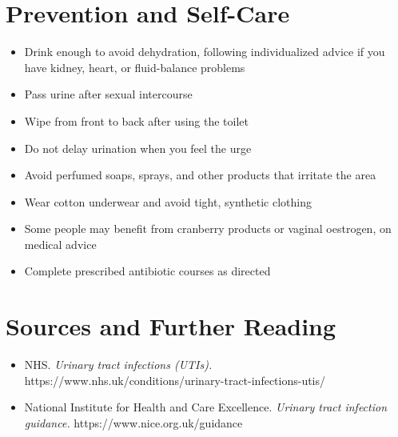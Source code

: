 \section*{Prevention and Self-Care}
\begin{itemize}
    \item Drink enough to avoid dehydration, following individualized advice if you have kidney, heart, or fluid-balance problems
    \item Pass urine after sexual intercourse
    \item Wipe from front to back after using the toilet
    \item Do not delay urination when you feel the urge
    \item Avoid perfumed soaps, sprays, and other products that irritate the area
    \item Wear cotton underwear and avoid tight, synthetic clothing
    \item Some people may benefit from cranberry products or vaginal oestrogen, on medical advice
    \item Complete prescribed antibiotic courses as directed
\end{itemize}

\section*{Sources and Further Reading}
\begin{itemize}
    \item NHS. \textit{Urinary tract infections (UTIs).} https://www.nhs.uk/conditions/urinary-tract-infections-utis/
    \item National Institute for Health and Care Excellence. \textit{Urinary tract infection guidance.} https://www.nice.org.uk/guidance
\end{itemize}
